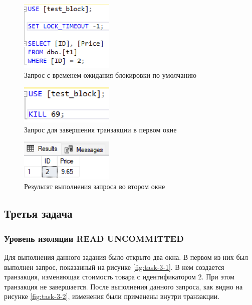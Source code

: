 \documentclass[a4paper, 14pt]{extarticle}
\begin{document}
\begin{figure}[H]
  \centering
  \includegraphics[width=0.4\textwidth]{images/task-2/16.png}
  \caption{Запрос с временем ожидания блокировки по умолчанию}
  \label{fig:task-2-16}
\end{figure}

\begin{figure}[H]
  \centering
  \includegraphics[width=0.4\textwidth]{images/task-2/17.png}
  \caption{Запрос для завершения транзакции в первом окне}
  \label{fig:task-2-17}
\end{figure}

\begin{figure}[H]
  \centering
  \includegraphics[width=0.4\textwidth]{images/task-2/18.png}
  \caption{Результат выполнения запроса во втором окне}
  \label{fig:task-2-18}
\end{figure}

\subsection{Третья задача}

\subsubsection{Уровень изоляции READ UNCOMMITTED}

Для выполнения данного задания было открыто два окна. В первом из них был
выполнен запрос, показанный на рисунке \ref{fig:task-3-1}. В нем создается
транзакция, изменяющая стоимость товара с идентификатором 2. При этом транзакция
не завершается. После выполнения данного запроса, как видно на рисунке
\ref{fig:task-3-2}, изменения были применены внутри транзакции.
\end{document}
